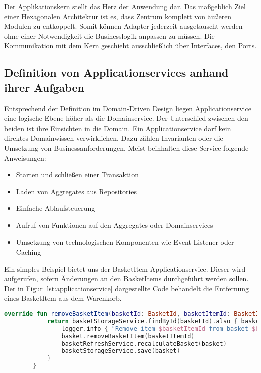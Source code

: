 Der Applikationskern stellt das Herz der Anwendung dar. Das maßgeblich Ziel einer Hexagonalen Architektur ist es, dass Zentrum komplett von äußeren Modulen zu entkoppelt. Somit können Adapter jederzeit ausgetauscht werden ohne einer Notwendigkeit die Businesslogik anpassen zu müssen. Die Kommunikation mit dem Kern geschieht ausschließlich über Interfaces, den Ports.

\subsection{Definition von Applicationservices anhand ihrer Aufgaben}

Entsprechend der Definition im Domain-Driven Design liegen Applicationservice eine logische Ebene höher als die Domainservice. Der Unterschied zwischen den beiden ist ihre Einsichten in die Domain. Ein Applicationservice darf kein direktes Domainwissen verwirklichen. Dazu zählen Invarianten oder die Umsetzung von Businessanforderungen.
Meist beinhalten diese Service folgende Anweisungen:

\begin{itemize}[noitemsep,nolistsep]
	\item Starten und schließen einer Transaktion
	\item Laden von Aggregates aus Repositories
	\item Einfache Ablaufsteuerung
	\item Aufruf von Funktionen auf den Aggregates oder Domainservices
	\item Umsetzung von technologischen Komponenten wie Event-Listener oder Caching
\end{itemize}

Ein simples Beispiel bietet uns der BasketItem-Applicationservice. Dieser wird aufgerufen, sofern Änderungen an den BasketItems durchgeführt werden sollen. Der in Figur \ref{lst:applicationservice} dargestellte Code behandelt die Entfernung eines BasketItem aus dem Warenkorb.

\begin{minipage}{\linewidth} %
	\begin{lstlisting}[caption={Eine Beispielsfunktion des BasketItem-Applikationservice}, label={lst:applicationservice}, language=Kotlin]
		override fun removeBasketItem(basketId: BasketId, basketItemId: BasketItemId): Basket {
			return basketStorageService.findById(basketId).also { basket ->
				logger.info { "Remove item $basketItemId from basket $basketId" }
				basket.removeBasketItem(basketItemId)
				basketRefreshService.recalculateBasket(basket)
				basketStorageService.save(basket)
			}
		}
	\end{lstlisting}
\end{minipage}


